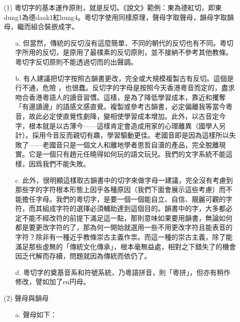 \documentclass[a5paper, 12pt, openany]{book} %
\begin{document}
\begin{itemize}
  \item [(1)] 粵切字的基本運作原則，就是反切。《說文》範例：東為德紅切，即東dung1為德daak1紅hung4。粵切字使用同樣原理，聲母字取聲母，韻母字取韻母，繼而組合裝嵌成字。
  \begin{itemize}
    \item [a.] 	但當然，傳統的反切沒有這麼簡單，不同的朝代的反切也有不同。粵切字所用的反切，是原用了最樸素的反切原則，並不接納不參考其他教條。粵切字反切原則不能透過切而的出聲調。

    \item [b.]	有人建議把切字按照古韻書更改，完全或大規模複製古有反切。這個是行不通，危險 ，也很蠢。反切字的字母是按照今天香港粵音而定的，盡求吻合香港粵語人的讀音習慣。這樣，是為了降低學習成本，靠近和攫奪「有邊讀邊」的語感文感直覺。複製或參考古韻書，必定偏離我等當今粵音，故此必定使直覺性劇降，變相使學習成本增加。此外，以古音定今字，根本就是以古薄今——這樣肯定會造成用家的心理離異（國學人另計）。採用今音反而親切有趣，學習驅動更佳。老國音即是因為這樣所以失敗了——老國音只是一個文人和離地學者思哲自瀆的產品，完全脫離現實。它是一個只有趙元任曉得如何玩的語文玩兒。我們的文字系統不能這樣，因爲我們不能失敗。

    \item [c.]	此外，很明顯這樣取古韻書中的切字來做字母一建議，完全沒有考慮到那些字的字符根本形態上因乎各種原因（我們下面會展示這些考慮）而不能擔任字母。我們的粵切字，是要一個一個能自立、自信、靚麗可觀的字符，而其組成字符的選擇必須輔助達到這個目的。韻書中的字，大多都必定不能不經改符的前提下滿足這一點，那則意味如果要用韻書，無論如何都是要更改字符的了，那為何一開始就選用一些不用更改字符且能表音的字符？除非有一種近乎教條崇古主義作祟。而這一種的崇古主義，除了能滿足那些虛無的「傳統文化傳承」，根本毫無益處，相對之下錯失了的機會因乏代解而存續，問題就因為傳統而依仍了。 

    \item [d.]	粵切字的奠基音系和符號系統，乃粵語拼音，則「粵拼」，但亦有稍作修改，譬如加了en円母。
  \end{itemize}

  \item[(2)] 聲母與韻母
  \begin{itemize}
    \item [a.]  聲母如下：
    

\end{itemize}
\end{itemize}
\end{document}
